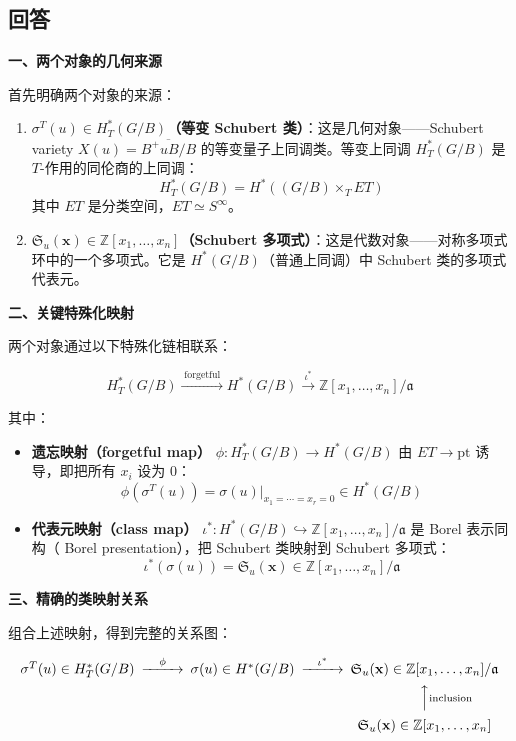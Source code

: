 \subsection{回答}

\textbf{一、两个对象的几何来源}

首先明确两个对象的来源：

\begin{enumerate}
\item \textbf{$\sigma^T(u) \in H_T^*(G/B)$（等变 Schubert 类）}：这是几何对象——Schubert variety $X(u) = \overline{B^+uB/B}$ 的等变量子上同调类。等变上同调 $H_T^*(G/B)$ 是 $T$-作用的同伦商的上同调：
$$H_T^*(G/B) = H^*\left((G/B) \times_T ET\right)$$
其中 $ET$ 是分类空间，$ET \simeq S^\infty$。

\item \textbf{$\mathfrak{S}_u(\mathbf{x}) \in \mathbb{Z}[x_1,\ldots,x_n]$（Schubert 多项式）}：这是代数对象——对称多项式环中的一个多项式。它是 $H^*(G/B)$（普通上同调）中 Schubert 类的多项式代表元。
\end{enumerate}

\textbf{二、关键特殊化映射}

两个对象通过以下特殊化链相联系：

\[
H_T^*(G/B) \xrightarrow{\;\text{forgetful}\;} H^*(G/B) \xrightarrow{\;\iota^*\;} \mathbb{Z}[x_1,\ldots,x_n]/\mathfrak{a}
\]

其中：

\begin{itemize}
\item \textbf{遗忘映射（forgetful map）} $\phi: H_T^*(G/B) \to H^*(G/B)$ 由 $ET \to \mathrm{pt}$ 诱导，即把所有 $x_i$ 设为 0：
$$\phi(\sigma^T(u)) = \sigma(u)|_{x_1=\cdots=x_r=0} \in H^*(G/B)$$

\item \textbf{代表元映射（class map）} $\iota^*: H^*(G/B) \hookrightarrow \mathbb{Z}[x_1,\ldots,x_n]/\mathfrak{a}$ 是 Borel 表示同构（ Borel presentation），把 Schubert 类映射到 Schubert 多项式：
$$\iota^*(\sigma(u)) = \mathfrak{S}_u(\mathbf{x}) \in \mathbb{Z}[x_1,\ldots,x_n]/\mathfrak{a}$$
\end{itemize}

\textbf{三、精确的类映射关系}

组合上述映射，得到完整的关系图：

\[
\begin{CD}
\sigma^T(u) \in H_T^*(G/B) @>{\phi}>> \sigma(u) \in H^*(G/B) @>{\iota^*}>> \mathfrak{S}_u(\mathbf{x}) \in \mathbb{Z}[x_1,\ldots,x_n]/\mathfrak{a} \\
@. @. @AA{\text{inclusion}}A \\
@. @. \mathfrak{S}_u(\mathbf{x}) \in \mathbb{Z}[x_1,\ldots,x_n]
\end{CD}
\]

